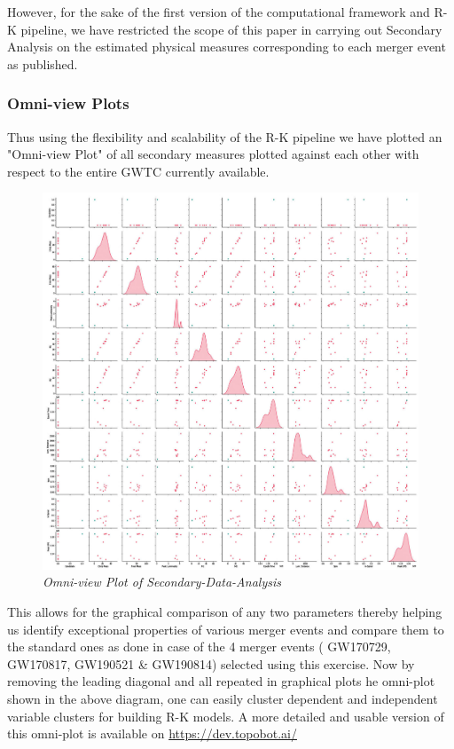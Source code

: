     However, for the sake of the first version of the computational framework and R-K pipeline, we have restricted the scope of this paper in carrying out Secondary Analysis on the estimated physical measures corresponding to each merger event as published. \cite{00_LIGOOpenSciData} \cite{00.7_LIGOBayesianAnalysis} \cite{00.6_LIGOAnalysisPipeline}

    \subsubsection{Omni-view Plots}

    Thus using the flexibility and scalability of the R-K pipeline we have plotted an "Omni-view Plot" of all secondary measures plotted against each other with respect to the entire GWTC currently available.

    \begin{figure}[H]
        \centering
        \includegraphics[width=1.0\linewidth]{images/52_09_Seconday-Data-Analysis_OmniView.jpg}
        \caption{\textit{Omni-view Plot of Secondary-Data-Analysis}}
        \label{fig:LIGO6_PlaceHolder_fig}
    \end{figure}

    This allows for the graphical comparison of any two parameters thereby helping us identify exceptional properties of various merger events and compare them to the standard ones as done in case of the 4 merger events ( GW170729, GW170817, GW190521 \& GW190814) selected using this exercise. Now by removing the leading diagonal and all repeated  in graphical plots he omni-plot shown in the above diagram, one can easily cluster dependent and independent variable clusters for building R-K models. A more detailed and usable version of this omni-plot is available on \url{https://dev.topobot.ai/}

